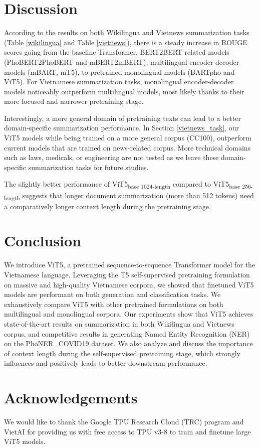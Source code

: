 \documentclass[11pt,a4paper]{article}
\begin{document}
 
\section{Discussion}
According to the results on both Wikilingua and Vietnews summarization tasks (Table \ref{wikilingua} and Table \ref{vietnews}), there is a steady increase in ROUGE scores going from the baseline Transformer, BERT2BERT related models (PhoBERT2PhoBERT and mBERT2mBERT), multilingual encoder-decoder models (mBART, mT5), to pretrained monolingual models (BARTpho and ViT5). For Vietnamese summarization tasks, monolingual encoder-decoder models noticeably outperform multilingual models, most likely thanks to their more focused and narrower pretraining stage.

Interestingly, a more general domain of pretraining texts can lead to a better domain-specific summarization performance. In Section \ref{vietnews_task}, our ViT5 models while being trained on a more general corpus (CC100), outperform current models that are trained on news-related corpus. More technical domains such as laws, medicals, or engineering are not tested as we leave these domain-specific summarization tasks for future studies.

The slightly better performance of ViT5\textsubscript{base 1024-length} compared to ViT5\textsubscript{base 256-length} suggests that longer document summarization (more than 512 tokens) need a comparatively longer context length during the pretraining stage. \section{Conclusion}


We introduce ViT5, a pretrained sequence-to-sequence Transformer model for the Vietnamese language. Leveraging the T5 self-supervised pretraining formulation on massive and high-quality Vietnamese corpora, we showed that finetuned ViT5 models are performant on both generation and classification tasks. We exhaustively compare ViT5 with other pretrained formulations on both multilingual and monolingual corpora. Our experiments show that ViT5 achieves state-of-the-art results on summarization in both Wikilingua and Vietnews corpus, and competitive results in generating Named Entity Recognition (NER) on the PhoNER\_COVID19 dataset. We also analyze and discuss the importance of context length during the self-supervised pretraining stage, which strongly influences and positively leads to better downstream performance. 
\section{Acknowledgements}
We would like to thank the Google TPU Research Cloud (TRC) program and VietAI for providing us with free access to TPU v3-8 to train and finetune large ViT5 models. 
\newpage



\end{document}
